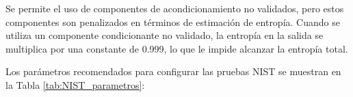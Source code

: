             Se permite el uso de componentes de acondicionamiento no validados, pero estos componentes son penalizados en términos de estimación de entropía. Cuando se utiliza un componente condicionante no validado, la entropía en la salida se multiplica por una constante de 0.999, lo que le impide alcanzar la entropía total.

            Los parámetros recomendados para configurar las pruebas NIST se muestran en la Tabla \ref{tab:NIST_parametros}:

            \begin{table}[htbp]
                \caption{Parámetros recomendados para el conjunto de pruebas del NIST.}
                \begin{center}
                \label{tab:NIST_parametros}
                \end{center}
            \end{table}
                    
